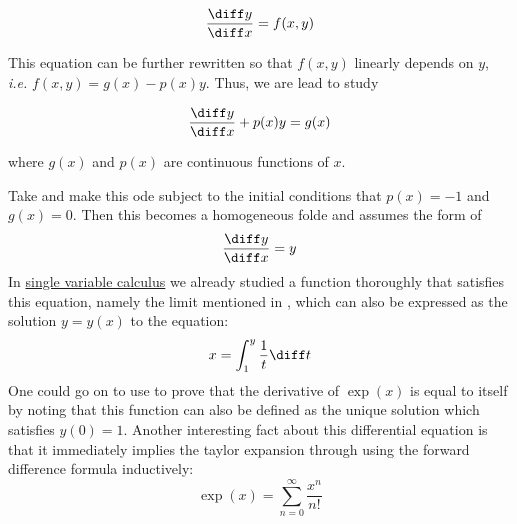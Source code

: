 \begin{equation}\label{eq-folde-simple2}
	\frac{\diff y}{\diff x} = f(x, y)
\end{equation}

\begin{flushleft}
	This equation can be further rewritten so that $f(x,y)$ linearly depends on
	$y$, \emph{i.e.} $f(x,y) = g(x) - p(x)y$. Thus, we are lead to study
\end{flushleft}

\begin{equation}\label{eq-folde-simple3}
	\frac{\diff y}{\diff x} + p(x)y = g(x)
\end{equation}

\begin{flushleft}
	where $g(x)$ and $p(x)$ are continuous functions of $x$.
\end{flushleft}

\begin{exm}\label{exm-diff-eq-euler}
	Take  and make this \gls{ode} subject to
	the initial conditions that $p(x)=-1$ and $g(x)=0$. Then this becomes a
	homogeneous \gls{folde} and assumes the form of
	\begin{equation}\label{eq-diff-eq-euler}
		\frac{\diff y}{\diff x} = y
	\end{equation}
	In \hyperref[sec-single-var-calc]{single variable calculus} we already
	studied a function thoroughly that satisfies this equation, namely
	the limit mentioned in , which can also
	be expressed as the solution $y=y(x)$ to the equation:
	\begin{equation*}
		x = \int_1^y \frac{1}{t} \diff t
	\end{equation*}
	One could go on to use  to prove that the
	derivative of $\exp(x)$ is equal to itself by noting that this function can
	also be defined as the unique solution which satisfies $y(0)=1$. Another
	interesting fact about this differential equation is that it immediately implies
	the taylor expansion through using the forward difference formula inductively:
	\begin{equation*}
		\exp(x) = \sum_{n=0}^\infty \frac{x^n}{n!}
	\end{equation*}
\end{exm}
